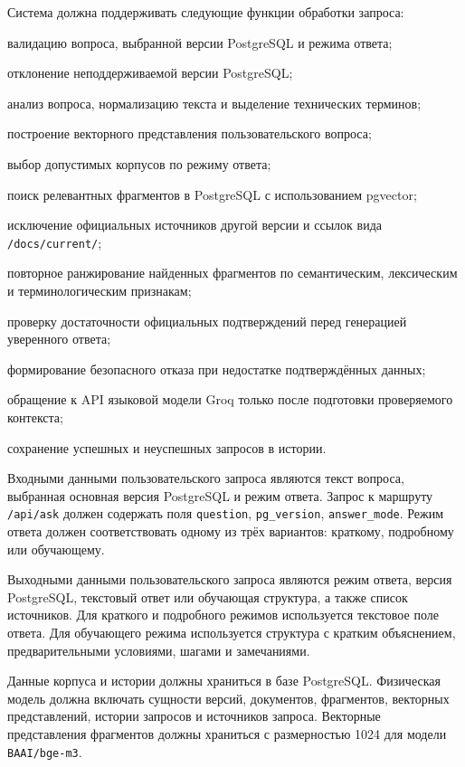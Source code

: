 Система должна поддерживать следующие функции обработки запроса:

\begin{compactlist}
  \item валидацию вопроса, выбранной версии PostgreSQL и режима ответа;
  \item отклонение неподдерживаемой версии PostgreSQL;
  \item анализ вопроса, нормализацию текста и выделение технических терминов;
  \item построение векторного представления пользовательского вопроса;
  \item выбор допустимых корпусов по режиму ответа;
  \item поиск релевантных фрагментов в PostgreSQL с использованием pgvector;
  \item исключение официальных источников другой версии и ссылок вида \texttt{/docs/current/};
  \item повторное ранжирование найденных фрагментов по семантическим, лексическим и терминологическим признакам;
  \item проверку достаточности официальных подтверждений перед генерацией уверенного ответа;
  \item формирование безопасного отказа при недостатке подтверждённых данных;
  \item обращение к API языковой модели Groq только после подготовки проверяемого контекста;
  \item сохранение успешных и неуспешных запросов в истории.
\end{compactlist}


Входными данными пользовательского запроса являются текст вопроса, выбранная основная версия PostgreSQL и режим ответа. Запрос к маршруту \texttt{/api/ask} должен содержать поля \texttt{question}, \texttt{pg\_version}, \texttt{answer\_mode}. Режим ответа должен соответствовать одному из трёх вариантов: краткому, подробному или обучающему.

Выходными данными пользовательского запроса являются режим ответа, версия PostgreSQL, текстовый ответ или обучающая структура, а также список источников. Для краткого и подробного режимов используется текстовое поле ответа. Для обучающего режима используется структура с кратким объяснением, предварительными условиями, шагами и замечаниями.

Данные корпуса и истории должны храниться в базе PostgreSQL. Физическая модель должна включать сущности версий, документов, фрагментов, векторных представлений, истории запросов и источников запроса. Векторные представления фрагментов должны храниться с размерностью 1024 для модели \texttt{BAAI/bge-m3}.

